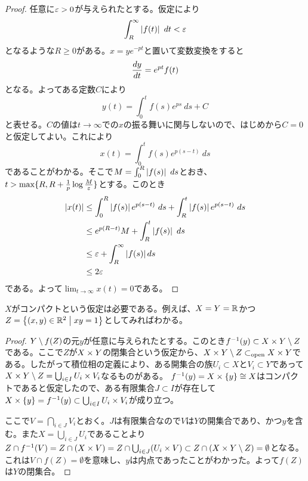 \begin{proof}
  任意に${\varepsilon} > 0$が与えられたとする。仮定により
  \[
  \int_R^{\infty}  \left \lvert f(t) \right \rvert \ dt < {\varepsilon}
  \]
  となるような$R \geq 0$がある。$x = y e^{-pt}$と置いて変数変換をすると
  \[
  \frac{dy}{dt} = e^{pt}f(t)
  \]
  となる。よってある定数$C$により
  \[
  y(t) = \int_0^t f(s)e^{ps} \ ds + C
  \]
と表せる。$C$の値は$t \to \infty$での$x$の振る舞いに関与しないので、はじめから$C=0$と仮定してよい。これにより
\[
x(t) =   \int_0^t f(s)e^{p(s-t)} \ ds
\]
であることがわかる。そこで$M =  \int_0^R \left \lvert f(s) \right \rvert \ ds $とおき、$ t > \max \{ R, R+ \frac{1}{p} \log \frac{M}{{\varepsilon}} \}$とする。このとき
\begin{align*}
  \left \lvert x(t) \right \rvert &\leq \int_0^R \left \lvert f(s) \right \rvert e^{p(s-t)} \ ds  + \int_R^t \left \lvert f(s) \right \rvert e^{p(s-t)} \ ds  \\
  &\leq e^{p(R-t)} M + \int_R^t \left \lvert f(s) \right \rvert \ ds  \\
  &\leq {\varepsilon}  + \int_R^{\infty} \left \lvert f(s) \right \rvert  ds \\
  &\leq 2{\varepsilon}
\end{align*}
である。よって$\lim_{t \to \infty} x(t) = 0$である。
\end{proof}



\newpage





\begin{rem}
  $X$がコンパクトという仮定は必要である。例えば、$X=Y={\mathbb R}$かつ$Z=\left\{ (x,y) \in {\mathbb R}^2 \mathrel{} \middle| \mathrel{} xy=1 \right\}$としてみればわかる。
\end{rem}
\begin{proof}
$Y \setminus f(Z)$の元$y$が任意に与えられたとする。このとき$f^{-1}(y) \subset X \times Y \setminus Z$である。ここで$Z$が$X\times Y$の閉集合という仮定から、$X \times Y \setminus Z \subset_{\text{open}} X \times Y$である。したがって積位相の定義により、ある開集合の族$U_i \subset X$と$V_i \subset Y$であって$X \times Y \setminus Z = \bigcup_{i \in I} U_i \times V_i$なるものがある。
$f^{-1}(y) = X \times \{ y \} \cong X$はコンパクトであると仮定したので、ある有限集合$J \subset I$が存在して$X \times \{y\} = f^{-1}(y) \subset \bigcup_{i \in I} U_i \times V_i$が成り立つ。

ここで$V = \bigcap_{i \in J} V_i$とおく。$J$は有限集合なので$V$は$Y$の開集合であり、かつ$y$を含む。また$X = \bigcup_{i \in J} U_i$であることより$Z \cap f^{-1}(V) = Z \cap (X \times V) = Z \cap \bigcup_{i \in J} (U_i \times V) \subset Z \cap (X \times Y \setminus Z) = \emptyset$となる。
これは$V \cap f(Z) = \emptyset$を意味し、$y$は内点であったことがわかった。よって$f(Z)$は$Y$の閉集合。
\end{proof}


